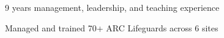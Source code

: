 \documentclass[letterpaper]{resume} %
\begin{document}
\begin{minipage}[t]{0.66\textwidth}
\sectionspace %


\begin{tightitemize}
\item 9 years management, leadership, and teaching experience
\item Managed and trained 70+ ARC Lifeguards across 6 sites
\end{tightitemize}



\end{minipage} %



\end{document}
